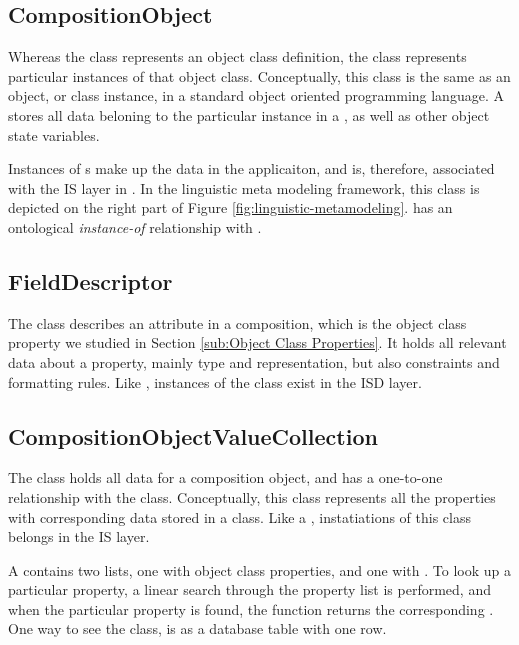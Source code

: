 \subsection{CompositionObject}
\label{sub:CompositionObject}
Whereas the  class represents an object class definition, the  class represents particular instances of that object class. Conceptually, this class is the same as an object, or class instance, in a standard object oriented programming language. A  stores all data beloning to the particular instance in a , as well as other object state variables.

Instances of s make up the data in the applicaiton, and is, therefore, associated with the IS layer in \mde. In the linguistic meta modeling framework, this class is depicted on the right part of Figure \ref{fig:linguistic-metamodeling}.  has an ontological \textit{instance-of} relationship with .

\subsection{FieldDescriptor}
\label{sub:FieldDescriptor}
The  class describes an attribute in a composition, which is the object class property we studied in Section \ref{sub:Object Class Properties}. It holds all relevant data about a property, mainly type and representation, but also constraints and formatting rules. Like , instances of the  class exist in the ISD layer.

\subsection{CompositionObjectValueCollection}
\label{sub:CompositionObjectValueCollection}
The  class holds all data for a composition object, and has a one-to-one relationship with the  class. Conceptually, this class represents all the properties with corresponding data stored in a class. Like a , instatiations of this class belongs in the IS layer.

A  contains two lists, one with object class properties, and one with . To look up a particular property, a linear search through the property list is performed, and when the particular property is found, the function returns the corresponding . One way to see the  class, is as a database table with one row.


